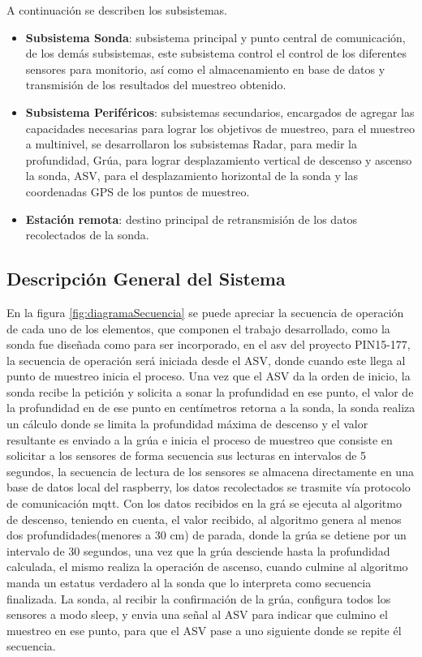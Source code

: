 A continuación se describen los subsistemas.
\begin{itemize}
    \item \textbf{Subsistema Sonda}: subsistema principal y punto central de comunicaci\'on, de los dem\'as subsistemas, este subsistema control el control de los diferentes sensores para monitorio, as\'i como el almacenamiento en base de datos y transmisión de los resultados del muestreo obtenido.
    \item \textbf{Subsistema Perif\'ericos}: subsistemas secundarios, encargados de agregar las capacidades necesarias para lograr los objetivos de muestreo, para el muestreo a multinivel, se desarrollaron los subsistemas Radar, para medir la profundidad, Gr\'ua, para lograr desplazamiento vertical de descenso y ascenso la sonda, ASV, para el desplazamiento horizontal de la sonda y las coordenadas GPS de los puntos de  muestreo. 
    \item \textbf{Estaci\'on remota}: destino principal de retransmisi\'on de los datos recolectados de la sonda. 
\end{itemize}

\subsection[Descripción General del Sistema]{Descripción General del Sistema}
En la figura \ref{fig:diagramaSecuencia} se puede apreciar la secuencia de operaci\'on de cada uno de los elementos, que componen el trabajo desarrollado, como la sonda fue dise\~nada como para ser incorporado, en el asv del proyecto PIN15-177, la secuencia de operaci\'on ser\'a iniciada desde el ASV, donde cuando este llega al punto de muestreo inicia el proceso. 
Una vez que el ASV da la orden de inicio, la sonda recibe la petici\'on y solicita a sonar la profundidad en ese punto, el valor de la profundidad en de ese punto en cent\'imetros retorna a la sonda, la sonda realiza un c\'alculo donde se limita la profundidad m\'axima de descenso y el valor resultante es enviado a la gr\'ua e inicia el proceso de muestreo que consiste en solicitar a los sensores de forma secuencia sus lecturas en intervalos de 5 segundos, la secuencia de lectura de los sensores se almacena directamente en una base de datos local del raspberry, los datos recolectados se trasmite v\'ia protocolo de comunicaci\'on mqtt. 
Con los datos recibidos en la gr\'a se ejecuta al algoritmo de descenso, teniendo en cuenta, el valor recibido, al algoritmo genera al menos dos profundidades(menores a 30 cm) de parada, donde la gr\'ua se detiene por un intervalo de 30 segundos, una vez que la gr\'ua desciende hasta la profundidad calculada, el mismo realiza la operaci\'on de ascenso, cuando culmine al algoritmo manda un estatus verdadero al la sonda que lo interpreta como secuencia finalizada.
La sonda, al recibir la confirmaci\'on  de la gr\'ua, configura todos los sensores a modo sleep, y envia una se\~nal al ASV para indicar que culmino el muestreo en ese punto, para que el ASV pase a uno siguiente donde se repite \'el secuencia. 

